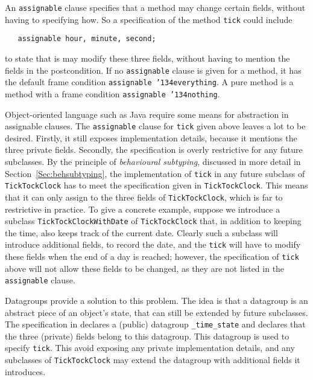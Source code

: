 \documentclass{llncs}
\def\everything{\texttt{\char'134everything}}
\def\nothing{\texttt{\char'134nothing}}
\begin{document}

An  \texttt{assignable} clause specifies that a method may change certain 
fields, without having to specifying how.
So a specification of the method \texttt{tick} could include
\begin{verbatim}
   assignable hour, minute, second;
\end{verbatim}
to state that is may modify these three fields, without having to mention
the fields in the postcondition.
If no \texttt{assignable} clause is given for a method, it has the
default frame condition \texttt{assignable \everything}.
A pure method is a method with a frame condition \texttt{assignable \nothing}.

Object-oriented language such as Java require some means for abstraction in
assignable clauses.  The \texttt{assignable} clause for \texttt{tick} given
above leaves a lot to be desired.  Firstly, it still exposes implementation
details, because it mentions the three private fields.  Secondly, the
specification is overly restrictive for any future subclasses.  By the
principle of \emph{behavioural subtyping}, discussed in more detail in
Section~\ref{Sec:behsubtyping}, the implementation of \texttt{tick} in any
future subclass of \texttt{TickTockClock} has to meet the specification given
in \texttt{TickTockClock}.  This means that it can only assign to the three
fields of \texttt{TickTockClock}, which is far to restrictive in practice.  To
give a concrete example, suppose we introduce a subclass
\texttt{Tick\-Tock\-Clock\-With\-Date} of \texttt{TickTockClock} that, in
addition to keeping the time, also keeps track of the current date.  Clearly
such a subclass will introduce additional fields, to record the date, and the
\texttt{tick} will have to modify these fields when the end of a day is
reached; however, the specification of \texttt{tick} above will not allow these
fields to be changed, as they are not listed in the \texttt{assignable} clause.

Datagroups \cite{Leino98} provide a solution to 
this problem. The idea is that a datagroup is an abstract piece of an object's
state, that can still be extended by future subclasses.
The specification in  declares a (public) datagroup
\texttt{\_time\_state} and declares that the three (private) fields belong
to this datagroup. This datagroup is used to specify \texttt{tick}.
This avoid exposing any private implementation details, and
any subclasses of \texttt{TickTockClock} may extend the datagroup with
additional fields it introduces.
\end{document}
